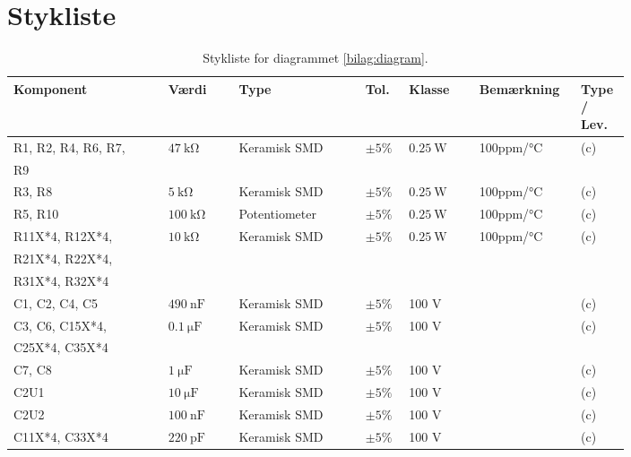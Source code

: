 \chapter{Stykliste} \label{bilag:styklister}
\begin{table}[h!]
\small
\caption{Stykliste for diagrammet \ref{bilag:diagram}.}
\label{tab:styklister}
\begin{threeparttable}
\begin{tabular}{p{0.22\linewidth}p{0.1\linewidth}p{0.18\linewidth}p{0.05\linewidth}p{0.1\linewidth}p{0.1\linewidth}p{0.05\linewidth}}
\toprule
\multicolumn{1}{l}{\textbf{Komponent}}       &
\multicolumn{1}{l}{\textbf{Værdi}}       &
\multicolumn{1}{l}{\textbf{Type}}       &
\multicolumn{1}{l}{\textbf{Tol.}} &
\multicolumn{1}{l}{\textbf{Klasse}} &
\multicolumn{1}{l}{\textbf{Bemærkning}} &
\multicolumn{1}{l}{\textbf{Type / Lev.}}  \\ 
\hline
R1, R2, R4, R6, R7,& $\SI{47}{\kilo\ohm}$ & Keramisk SMD & $\pm 5\%$ & $\SI{0.25}{\watt}$ & 100ppm/\si{\celsius} & (c) \\
R9 &&&&&& \\
R3, R8 & $\SI{5}{\kilo\ohm}$ & Keramisk SMD	& $\pm 5\%$ & $\SI{0.25}{\watt}$ & 100ppm/\si{\celsius}  & (c) \\
R5, R10 & $\SI{100}{\kilo\ohm}$ & Potentiometer	& $\pm 5\%$ & $\SI{0.25}{\watt}$ & 100ppm/\si{\celsius}  & (c) \\
R11X*4, R12X*4, & $\SI{10}{\kilo\ohm}$ & Keramisk SMD	& $\pm 5\%$ & $\SI{0.25}{\watt}$ & 100ppm/\si{\celsius}  & (c) \\
R21X*4, R22X*4, &&&&&& \\
R31X*4, R32X*4 &&&&&& \\
\midrule
C1, C2, C4, C5 & $\SI{490}{\nano\farad}$ & Keramisk SMD & $\pm 5\%$ & 100 \si{\volt} &  & (c)\\
C3, C6, C15X*4, & $\SI{0,1}{\micro\farad}$ & Keramisk SMD & $\pm 5\%$ & 100 \si{\volt} &  & (c)\\
C25X*4, C35X*4 &&&&&&\\
C7, C8 & $\SI{1}{\micro\farad}$ & Keramisk SMD & $\pm 5\%$ & 100 \si{\volt} &  & (c)\\
C2U1 & $\SI{10}{\micro\farad}$ & Keramisk SMD & $\pm 5\%$ & 100 \si{\volt} &  & (c)\\
C2U2 & $\SI{100}{\nano\farad}$ & Keramisk SMD & $\pm 5\%$ & 100 \si{\volt} &  & (c)\\
C11X*4, C33X*4 & $\SI{220}{\pico\farad}$ & Keramisk SMD & $\pm 5\%$ & 100 \si{\volt} &  & (c)\\

\end{tabular}
\end{threeparttable}
\end{table}
